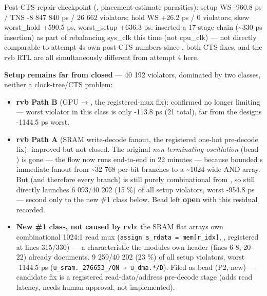 \begin{record}
{}

Post-CTS-repair checkpoint (,
placement-estimate parasitics): setup WS -960.8 ps / TNS -8 847 840 ps /
26 662 violators; hold WS +26.2 ps / 0 violators; skew
worst\_\allowbreak{}hold +590.5 ps, worst\_\allowbreak{}setup +636.3 ps.
 inserted a 17-stage 
chain (\textasciitilde330 ps insertion) as part of rebalancing sys\_clk
this time (not cpu\_clk) --- not directly comparable to attempt
4\textquotesingle s own post-CTS numbers since
, both CTS fixes, and the rvb RTL are all
simultaneously different from attempt 4 here.

\textbf{Setup remains far from closed} --- 40 192 violators, dominated
by two classes, neither a clock-tree/\allowbreak{}CTS problem:

\begin{itemize}
\tightlist
\item
  \textbf{rvb Path B} (GPU  → ,
  the  registered-mux fix): confirmed no
  longer limiting --- worst violator in this class is only -113.8 ps (21
  total), far from the design\textquotesingle s -1144.5 ps worst.
\item
  \textbf{rvb Path A} (SRAM write-decode  fanout, the
   registered one-hot pre-decode fix): improved but not
  closed. The original \emph{non-terminating oscillation} (bead
  ) is gone --- the flow now runs end-to-end in 22 minutes ---
  because  bounded \textquotesingle s
  immediate fanout from \textasciitilde32 768 per-bit branches to a
  \textasciitilde1024-wide  AND array. But 
  (and therefore every  branch) is still purely
  combinational from , so  still
  directly launches 6 093/40 202 (15 \%) of all setup violators, worst
  -954.8 ps --- second only to the new \#1 class below. Bead 
  left \textbf{open} with this residual recorded.
\item
  \textbf{New \#1 class, not caused by rvb}: the SRAM flat 
  array\textquotesingle s own combinational 1024:1 read mux
  (\texttt{assign\ s\_\allowbreak{}rdata\ =\allowbreak{}\ mem[r\_\allowbreak{}idx]},
  ,  registered at lines
  315/330) --- a characteristic the module\textquotesingle s own header
  (lines 6-8, 20-22) already documents. 9 259/40 202 (23 \%) of all
  setup violators, worst -1144.5 ps
  (\texttt{u\_\allowbreak{}sram.\allowbreak{}\_\allowbreak{}276653\_\allowbreak{}/\allowbreak{}QN\ →\ u\_\allowbreak{}dma.\allowbreak{}*/\allowbreak{}D}).
  Filed as bead  (P2, new) --- candidate fix is a registered
  read-data/\allowbreak{}address pre-decode stage (adds read latency,
  needs human approval, not implemented).
\end{itemize}


\end{record}
